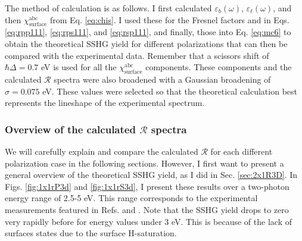 The method of calculation is as follows. I first calculated
$\varepsilon_{b}(\omega)$, $\varepsilon_{\ell}(\omega)$, and then
$\chi^{\mathrm{abc}}_{\mathrm{surface}}$ from Eq. \eqref{eq:chis}. I used these
for the Fresnel factors and in Eqs. \eqref{eq:rpp111}, \eqref{eq:rps111}, and
\eqref{eq:rsp111}, and finally, those into Eq. \eqref{eq:mc6} to obtain the
theoretical SSHG yield for different polarizations that can then be compared
with the experimental data. Remember that a scissors shift of $\hbar\Delta =
0.7$ eV is used for all the $\chi^{\mathrm{abc}}_{\mathrm{surface}}$ components.
These components and the calculated ${\mathcal{R}}$ spectra were also broadened
with a Gaussian broadening of $\sigma=0.075$ eV. These values were selected so
that the theoretical calculation best represents the lineshape of the
experimental spectrum.



\subsubsection{Overview of the calculated \texorpdfstring{$\mathcal{R}$}{R}
spectra}\label{sec:1x1R3D}

We will carefully explain and compare the calculated $\mathcal{R}$ for each
different polarization case in the following sections. However, I first want to
present a general overview of the theoretical SSHG yield, as I did in Sec.
\ref{sec:2x1R3D}. In Figs. \ref{fig:1x1rP3d} and \ref{fig:1x1rS3d}, I present
these results over a two-photon energy range of 2.5-5 eV. This range corresponds
to the experimental measurements featured in Refs. \cite{mejiaPRB02} and
\cite{bergfeldPRL04}. Note that the SSHG yield drops to zero very rapidly before
for energy values under 3 eV. This is because of the lack of surfaces states due
to the surface H-saturation.

